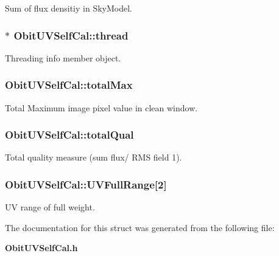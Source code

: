 Sum of flux densitiy in Sky\-Model. 

\subsubsection{$\ast$ {\bf Obit\-UVSelf\-Cal::thread}}\label{structObitUVSelfCal_o4}


Threading info member object. 

\subsubsection{ {\bf Obit\-UVSelf\-Cal::total\-Max}}\label{structObitUVSelfCal_o16}


Total Maximum image pixel value in clean window. 

\subsubsection{ {\bf Obit\-UVSelf\-Cal::total\-Qual}}\label{structObitUVSelfCal_o19}


Total quality measure (sum flux/ RMS field 1). 

\subsubsection{ {\bf Obit\-UVSelf\-Cal::UVFull\-Range}[2]}\label{structObitUVSelfCal_o15}


UV range of full weight. 



The documentation for this struct was generated from the following file:\begin{CompactItemize}
\item 
{\bf Obit\-UVSelf\-Cal.h}\end{CompactItemize}
